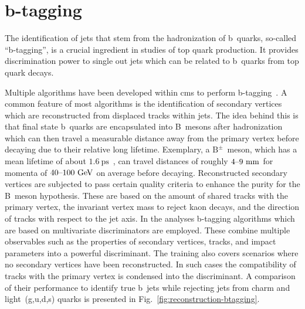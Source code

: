 \section{b-tagging}

The identification of jets that stem from the hadronization of b~quarks, so-called ``b-tagging'', is a crucial ingredient in studies of top quark production. It provides discrimination power to single out jets which can be related to b~quarks from top quark decays.

Multiple algorithms have been developed within \gls{cms} to perform b-tagging~\cite{Chatrchyan:2012jua,CMS-PAS-BTV-15-001}. A common feature of most algorithms is the identification of secondary vertices which are reconstructed from displaced tracks within jets. The idea behind this is that final state b~quarks are encapsulated into  B~mesons after hadronization which can then travel a measurable distance away from the primary vertex before decaying due to their relative long lifetime. Exemplary, a $\mathrm{B}^{\pm}$~meson, which has a mean lifetime of about $1.6~\mathrm{ps}$~\cite{Olive:2016xmw}, can travel distances of roughly $4\text{--}9~\mathrm{mm}$ for momenta of $40\text{--}100~\mathrm{GeV}$ on average before decaying. Reconstructed secondary vertices are subjected to pass certain quality criteria to enhance the purity for the B~meson hypothesis. These are based on the amount of shared tracks with the primary vertex, the invariant vertex mass to reject kaon decays, and the direction of tracks with respect to the jet axis. In the analyses b-tagging algorithms which are based on multivariate discriminators are employed. These combine multiple observables such as the properties of secondary vertices, tracks, and impact parameters into a powerful discriminant. The training also covers scenarios where no secondary vertices have been reconstructed. In such cases the compatibility of tracks with the primary vertex is condensed into the discriminant. A comparison of their performance to identify true b~jets while rejecting jets from charm and light~(g,u,d,s) quarks is presented in Fig.~\ref{fig:reconstruction-btagging}.


